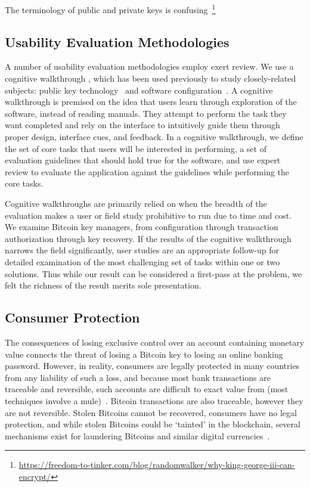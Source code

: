 \begin{compactlist}
  \item The terminology of public and private keys is confusing~\footnote{\url{https://freedom-to-tinker.com/blog/randomwalker/why-king-george-iii-can-encrypt/}}~\cite{}
  \item 
  \item 
\end{compactlist}

\subsection{Usability Evaluation Methodologies}

A number of usability evaluation methodologies employ exert review. We use a cognitive walkthrough \cite{cw}, which has been used previously to study closely-related subjects: public key technology~\cite{johnny} and software configuration~\cite{}. A cognitive walkthrough is premised on the idea that users learn through exploration of the software, instead of reading manuals. They attempt to perform the task they want completed and rely on the interface to intuitively guide them through proper design, interface cues, and feedback. In a cognitive walkthrough, we define the set of core tasks that users will be interested in performing, a set of evaluation guidelines that should hold true for the software, and use expert review to evaluate the application against the guidelines while performing the core tasks. 

Cognitive walkthroughs are primarily relied on when the breadth of the evaluation makes a user or field study prohibitive to run due to time and cost. We examine  Bitcoin key managers, from configuration through transaction authorization through key recovery. If the results of the cognitive walkthrough narrows the field significantly, user studies are an appropriate follow-up for detailed examination of the most challenging set of tasks within one or two solutions. Thus while our result can be considered a first-pass at the problem, we felt the richness of the result merits sole presentation.

\subsection{Consumer Protection} 

The consequences of losing exclusive control over an account containing monetary value connects the threat of losing a Bitcoin key to losing an online banking password. However, in reality, consumers are legally protected in many countries from any liability of such a loss, and because most bank transactions are traceable and reversible, such accounts are difficult to exact value from (most techniques involve a mule)~\cite{}. Bitcoin transactions are also traceable, however they are not reversible. Stolen Bitcoins cannot be recovered, consumers have no legal protection, and while stolen Bitcoins could be `tainted' in the blockchain, several mechanisms exist for laundering Bitcoins and similar digital currencies~\cite{}.


